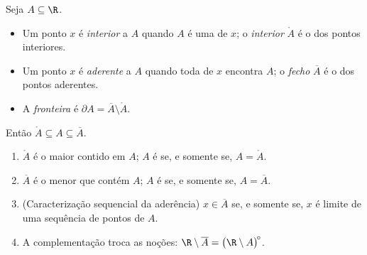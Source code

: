 \begin{definition}\label{def:b1:topology:closure}
Seja $A \subseteq \R$.
\begin{itemize}
  \item Um ponto $x$ é \emph{interior} a $A$ quando $A$ é uma
         de $x$; o \emph{interior}
        $\mathring{A}$ é o  dos pontos interiores.
  \item Um ponto $x$ é \emph{aderente} a $A$ quando toda 
        de $x$ encontra $A$; o \emph{fecho}
        $\overline{A}$ é o  dos pontos aderentes.
  \item A \emph{fronteira} é $\partial A = \overline A \setminus
        \mathring A$.
\end{itemize}
Então $\mathring A \subseteq A \subseteq \overline A$.
\end{definition}

\begin{proposition}\label{prop:b1:topology:closureprops}
\begin{enumerate}
  \item $\mathring A$ é o maior  contido em $A$; $A$
        é  se, e somente se, $A = \mathring A$.
  \item $\overline A$ é o menor  que contém $A$; $A$
        é  se, e somente se, $A = \overline A$.
  \item (Caracterização sequencial da aderência) $x \in \overline
        A$ se, e somente se, $x$ é limite de uma sequência de pontos de
        $A$.
  \item A complementação troca as noções: $\R \setminus
        \overline A = \bigl(\R \setminus A\bigr)^{\!\circ}$.
\end{enumerate}
\end{proposition}

